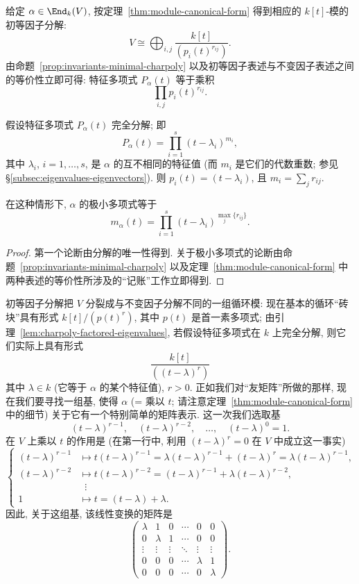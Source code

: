 给定 $\alpha\in\End_k(V)$, 按定理~\ref{thm:module-canonical-form} 得到相应的 $k[t]$-模的初等因子分解:
\[
V\cong\bigoplus_{i,j}\frac{k[t]}{(p_i(t)^{r_{ij}})}.
\]
由命题~\ref{prop:invariants-minimal-charpoly} 以及初等因子表述与不变因子表述之间的等价性立即可得: 特征多项式 $P_\alpha(t)$ 等于乘积
\[
\prod_{i,j}p_i(t)^{r_{ij}}.
\]

\begin{lemma}\label{lem:charpoly-factored-eigenvalues}
假设特征多项式 $P_\alpha(t)$ 完全分解; 即
\[
P_\alpha(t)=\prod_{i=1}^s(t-\lambda_i)^{m_i},
\]
其中 $\lambda_i$, $i=1,\ldots,s$, 是 $\alpha$ 的互不相同的特征值 (而 $m_i$ 是它们的代数重数; 参见 §\ref{subsec:eigenvalues-eigenvectors}). 则 $p_i(t)=(t-\lambda_i)$, 且 $m_i=\sum_j r_{ij}$.

在这种情形下, $\alpha$ 的极小多项式等于
\[
m_\alpha(t)=\prod_{i=1}^s(t-\lambda_i)^{\max_j\{r_{ij}\}}.
\]
\end{lemma}

\begin{proof}
第一个论断由分解的唯一性得到. 关于极小多项式的论断由命题~\ref{prop:invariants-minimal-charpoly} 以及定理~\ref{thm:module-canonical-form} 中两种表述的等价性所涉及的``记账''工作立即得到.
\end{proof}

初等因子分解把 $V$ 分裂成与不变因子分解不同的一组循环模: 现在基本的循环``砖块''具有形式 $k[t]/(p(t)^r)$, 其中 $p(t)$ 是首一素多项式; 由引理~\ref{lem:charpoly-factored-eigenvalues}, 若假设特征多项式在 $k$ 上完全分解, 则它们实际上具有形式
\[
\frac{k[t]}{((t-\lambda)^r)}
\]
其中 $\lambda\in k$ (它等于 $\alpha$ 的某个特征值), $r>0$. 正如我们对``友矩阵''所做的那样, 现在我们要寻找一组基, 使得 $\alpha$ (= 乘以 $t$; 请注意定理~\ref{thm:module-canonical-form} 中的细节) 关于它有一个特别简单的矩阵表示. 这一次我们选取基
\[
(t-\lambda)^{r-1},\quad(t-\lambda)^{r-2},\quad\ldots,\quad(t-\lambda)^0=1.
\]
在 $V$ 上乘以 $t$ 的作用是 (在第一行中, 利用 $(t-\lambda)^r=0$ 在 $V$ 中成立这一事实)
\[
\left\{
\begin{aligned}
(t-\lambda)^{r-1}&\longmapsto t(t-\lambda)^{r-1}=\lambda(t-\lambda)^{r-1}+(t-\lambda)^r=\lambda(t-\lambda)^{r-1},\\
(t-\lambda)^{r-2}&\longmapsto t(t-\lambda)^{r-2}=(t-\lambda)^{r-1}+\lambda(t-\lambda)^{r-2},\\
&\;\;\vdots\\
1&\longmapsto t=(t-\lambda)+\lambda.
\end{aligned}
\right.
\]
因此, 关于这组基, 该线性变换的矩阵是
\[
\begin{pmatrix}
\lambda&1&0&\cdots&0&0\\
0&\lambda&1&\cdots&0&0\\
\vdots&\vdots&\vdots&\ddots&\vdots&\vdots\\
0&0&0&\cdots&\lambda&1\\
0&0&0&\cdots&0&\lambda
\end{pmatrix}.
\]

